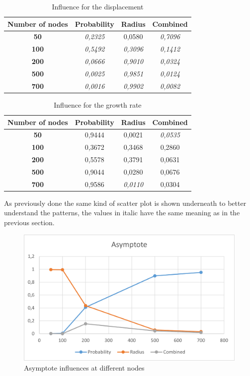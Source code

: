 \begin{table}[H]
\centering
\begin{tabular}{|c|c|c|c|}
\hline
\textbf{Number of   nodes} & \textbf{Probability} & \textbf{Radius} & \textbf{Combined} \\ \hline
\textbf{50} & \textit{0,2325} & 0,0580 & \textit{0,7096} \\ \hline
\textbf{100} & \textit{0,5492} & \textit{0,3096} & \textit{0,1412} \\ \hline
\textbf{200} & \textit{0,0666} & \textit{0,9010} & \textit{0,0324} \\ \hline
\textbf{500} & \textit{0,0025} & \textit{0,9851} & \textit{0,0124} \\ \hline
\textbf{700} & \textit{0,0016} & \textit{0,9902} & \textit{0,0082} \\ \hline
\end{tabular}
\caption{Influence for the displacement}
\end{table}




\begin{table}[H]\label{tab:Growth}
\centering
\begin{tabular}{|c|c|c|c|}
\hline
\textbf{Number of   nodes} & \textbf{Probability} & \textbf{Radius} & \textbf{Combined} \\ \hline
\textbf{50} & 0,9444 & 0,0021 & \textit{0,0535} \\ \hline
\textbf{100} & 0,3672 & 0,3468 & 0,2860 \\ \hline
\textbf{200} & 0,5578 & 0,3791 & 0,0631 \\ \hline
\textbf{500} & 0,9044 & 0,0280 & 0,0676 \\ \hline
\textbf{700} & 0,9586 & \textit{0,0110} & 0,0304 \\ \hline
\end{tabular}
\caption{Influence for the growth rate}
\end{table}

As previously done the same kind of scatter plot is shown underneath to better understand the patterns, the values in italic have the same meaning as in the previous section.

\begin{figure}[H]\label{pic:AsymptoteNodes}
\centering
    \includegraphics[width= 1\textwidth]{./images/AsymptoteWithNodes.png}
    \caption{Asymptote influences at different nodes}

\end{figure}

